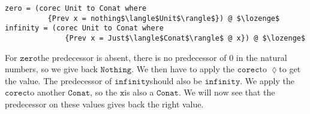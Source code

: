 \documentclass[a4paper,cleardoubleempty,BCOR1cm]{scrbook}
\begin{document}
\begin{lstlisting}
zero = (corec Unit to Conat where
          {Prev x = nothing$\langle$Unit$\rangle$}) @ $\lozenge$
infinity = (corec Unit to Conat where
              {Prev x = Just$\langle$Conat$\rangle$ @ x}) @ $\lozenge$
\end{lstlisting}

For $\mathtt{zero}$\;the predecessor is absent, there is no predecessor of 0 in the
natural numbers, so we give back $\mathtt{Nothing}$.  We then have to apply the
$\mathtt{corec}$\;to $\mathtt{\lozenge}$\;to get the value.  The predecessor of $\mathtt{infinity}$\;should also
be $\mathtt{infinity}$.  We apply the $\mathtt{corec}$\;to another $\mathtt{Conat}$, so the $\mathtt{x}$\;is also a
$\mathtt{Conat}$.  We will now see that the predecessor on these values gives back the
right value.
\end{document}
